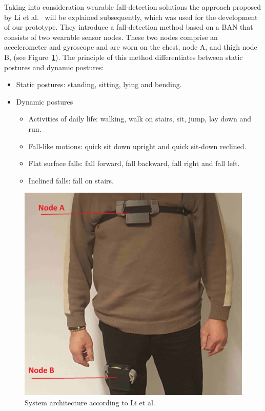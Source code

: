 \documentclass[conference]{IEEEtran}
\theoremstyle{definition}
\begin{document}
Taking into consideration wearable fall-detection solutions the approach proposed by Li et al.~\cite{Li2009} will be explained subsequently, 
which was used for the development of our prototype. They introduce a fall-detection method based on a BAN that consists 
of two wearable sensor nodes. These two nodes comprise an accelerometer and gyroscope and are worn on the chest, node A, and thigh 
node B, (see Figure~\ref{fig:simulation}). The principle of this method differentiates between static postures and dynamic postures: 

\begin{itemize}
 \item Static postures: standing, sitting, lying and bending.
 \item Dynamic postures
 \begin{itemize}
  \item Activities of daily life: walking, walk on stairs, sit, jump, lay down and run.
  \item Fall-like motions: quick sit down upright and quick sit-down reclined.
  \item Flat surface falls: fall forward, fall backward, fall right and fall left.
  \item Inclined falls: fall on stairs.
 \end{itemize}
\end{itemize}

\begin{figure}[!h]
  \centering
  \includegraphics[scale=0.25]{img/BasePrototype.png}
  \caption[System architecture]{System architecture according to Li et al.~\cite{Li2009}}
  \label{fig:simulation}
\end{figure}
\end{document}
